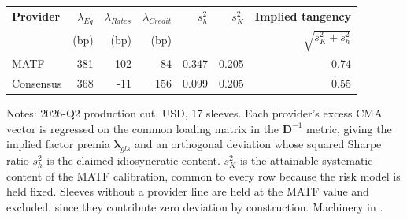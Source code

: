 
\begin{table}[H]
	\label{tab:provider_decomposition}\vspace*{-0.5\baselineskip}
	\begin{center}
		\footnotesize
		\begin{tabular}{l rrr rr r}
			\toprule
			\textbf{Provider} & $\lambda_{Eq}$ & $\lambda_{Rates}$ & $\lambda_{Credit}$ & $s^2_h$ & $s^2_K$ & \textbf{Implied tangency} \\
			& (bp) & (bp) & (bp) & & & $\sqrt{s^2_K + s^2_h}$ \\
			\midrule
			MATF         & 381 & 102 & 84 & 0.347 & 0.205 & 0.74 \\
			Consensus    & 368 & -11 & 156 & 0.099 & 0.205 & 0.55 \\
			\bottomrule
		\end{tabular}
	\end{center}
	\vspace*{-0.5\baselineskip}
	{\footnotesize Notes: 2026-Q2 production cut, USD, 17 sleeves. Each provider's excess CMA vector is regressed on the common loading matrix in the $\boldsymbol D^{-1}$ metric, giving the implied factor premia $\boldsymbol\lambda_{gls}$ and an orthogonal deviation whose squared Sharpe ratio $s^2_h$ is the claimed idiosyncratic content. $s^2_K$ is the attainable systematic content of the MATF calibration, common to every row because the risk model is held fixed. Sleeves without a provider line are held at the MATF value and excluded, since they contribute zero deviation by construction. Machinery in \citep{SeppKastenholzFAJ2026}.}
\end{table}
%
